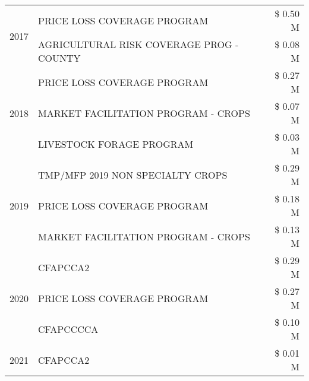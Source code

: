 \begin{tabular}{llr}
\cline{1-3}
\multirow[t]{2}{*}{2017} & PRICE LOSS COVERAGE PROGRAM & \$ 0.50 M \\
 & AGRICULTURAL RISK COVERAGE PROG - COUNTY & \$ 0.08 M \\
\cline{1-3}
\multirow[t]{3}{*}{2018} & PRICE LOSS COVERAGE PROGRAM & \$ 0.27 M \\
 & MARKET FACILITATION PROGRAM - CROPS & \$ 0.07 M \\
 & LIVESTOCK FORAGE PROGRAM & \$ 0.03 M \\
\cline{1-3}
\multirow[t]{3}{*}{2019} & TMP/MFP 2019 NON SPECIALTY CROPS & \$ 0.29 M \\
 & PRICE LOSS COVERAGE PROGRAM & \$ 0.18 M \\
 & MARKET FACILITATION PROGRAM - CROPS & \$ 0.13 M \\
\cline{1-3}
\multirow[t]{3}{*}{2020} & CFAPCCA2 & \$ 0.29 M \\
 & PRICE LOSS COVERAGE PROGRAM & \$ 0.27 M \\
 & CFAPCCCCA & \$ 0.10 M \\
\cline{1-3}
2021 & CFAPCCA2 & \$ 0.01 M \\
\cline{1-3}
\bottomrule
\end{tabular}
